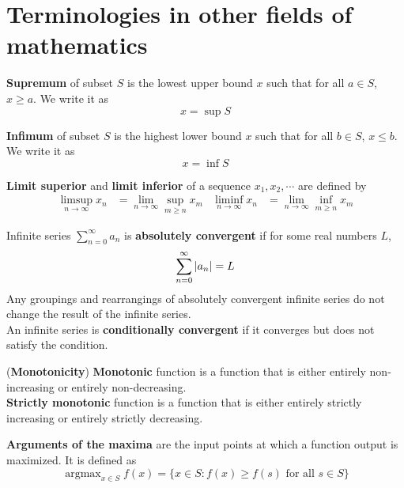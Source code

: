 \documentclass{huhtakm-template-book}
\DeclareMathOperator*{\argmax}{argmax}
\begin{document}
\chapter{Terminologies in other fields of mathematics}
\begin{defn}
	\textbf{Supremum} of subset $S$ is the lowest upper bound $x$ such that for all $a\in S$, $x\geq a$. We write it as
	\begin{equation*}
		x=\sup S
	\end{equation*}
\end{defn}
\begin{defn}
	\textbf{Infimum} of subset $S$ is the highest lower bound $x$ such that for all $b\in S$, $x\leq b$. We write it as
	\begin{equation*}
		x=\inf S
	\end{equation*}
\end{defn}
\begin{defn}
	\textbf{Limit superior} and \textbf{limit inferior} of a sequence $x_{1},x_{2},\cdots$ are defined by
	\begin{align*}
		\limsup_{n\to\infty}x_{n}&=\lim_{n\to\infty}\sup_{m\geq n}x_{m} & \liminf_{n\to\infty}x_{n}&=\lim_{n\to\infty}\inf_{m\geq n}x_{m}
	\end{align*}
\end{defn}
\begin{defn}
	Infinite series $\sum_{n=0}^{\infty}a_{n}$ is \textbf{absolutely convergent} if for some real numbers $L$,
	\begin{equation*}
		\sum_{n=0}^{\infty}\left|{a_{n}}\right|=L
	\end{equation*}
	Any groupings and rearrangings of absolutely convergent infinite series do not change the result of the infinite series.\\
	An infinite series is \textbf{conditionally convergent} if it converges but does not satisfy the condition.
\end{defn}
\begin{defn}(\textbf{Monotonicity})
	\textbf{Monotonic} function is a function that is either entirely non-increasing or entirely non-decreasing.\\
	\textbf{Strictly monotonic} function is a function that is either entirely strictly increasing or entirely strictly decreasing.
\end{defn}
\begin{defn}
	\textbf{Arguments of the maxima} are the input points at which a function output is maximized. It is defined as
	\begin{equation*}
		\argmax_{x\in S}f(x)=\{x\in S:f(x)\geq f(s)\text{ for all }s\in S\}
	\end{equation*}
\end{defn}
\end{document}
